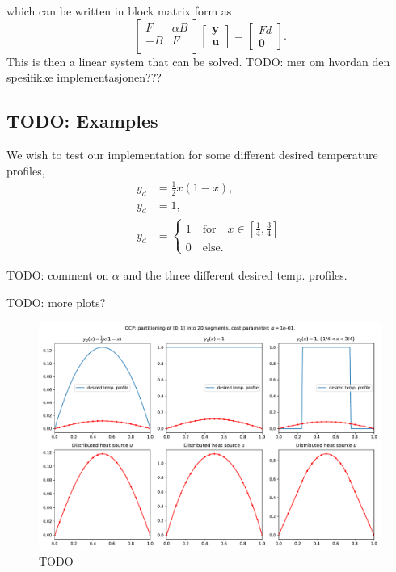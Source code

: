 which can be written in block matrix form as
$$
\begin{bmatrix}
   F & \alpha B \\
   -B & F \\
\end{bmatrix}
\begin{bmatrix}
    \mathbf{y} \\
    \mathbf{u}
\end{bmatrix}
= 
\begin{bmatrix} Fd \\
    \mathbf{0}
\end{bmatrix}.
$$
This is then a linear system that can be solved.
TODO: mer om hvordan den spesifikke implementasjonen???

\subsection{TODO: Examples}
We wish to test our implementation for some different desired temperature profiles,
\begin{align}
    \label{eq:desired_profiles}
    y_d &= \frac{1}{2}x(1-x), \\
    y_d &= 1, \\
    y_d &= \begin{cases}
        1 \quad \text{for} \quad x \in \left[ \frac{1}{4}, \frac{3}{4}\right] \\
        0 \quad \text{else}.
    \end{cases}
\end{align}


TODO: comment on \( \alpha \) and the three different desired temp. profiles.

TODO: more plots?


\begin{figure}[!h]
  \centering
  \includegraphics[width=\textwidth]{Images/plots/task2_fig_0.pdf}
  \caption{TODO}
  \label{fig:0}
\end{figure}

